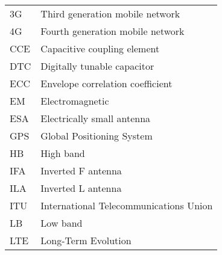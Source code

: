 \begin{tabular}{ll}
3G          & Third generation mobile network \\
4G          & Fourth generation mobile network \\
CCE         & Capacitive coupling element\\
DTC         & Digitally tunable capacitor\\
ECC         & Envelope correlation coefficient\\
EM          & Electromagnetic\\
ESA         & Electrically small antenna\\
GPS         & Global Positioning System \\
HB          & High band\\
IFA         & Inverted F antenna\\
ILA         & Inverted L antenna\\
ITU         & International Telecommunications Union \\
LB          & Low band\\
LTE         & Long-Term Evolution \\

\end{tabular}

